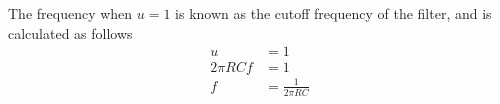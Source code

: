 The frequency when $u=1$ is known as the cutoff frequency of the filter, and
is calculated as follows
\begin{align}
  u &= 1 \nonumber \\
  2\pi R C f &= 1 \nonumber \\
  f &= \frac{1}{2\pi R C} \label{eq:RC_cuttof}
\end{align}
